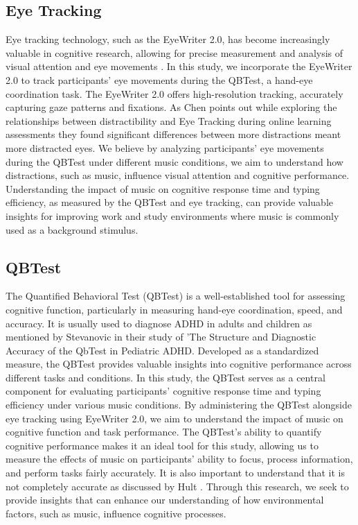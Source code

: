 \documentclass[manuscript, screen, review]{acmart} %
\begin{document}
\subsection{Eye Tracking}
Eye tracking technology, such as the EyeWriter 2.0, has become increasingly valuable in cognitive research, allowing for precise measurement and analysis of visual attention and eye movements \cite{Rana8642988}. 
In this study, we incorporate the EyeWriter 2.0 to track participants' eye movements during the QBTest, a hand-eye coordination task.
The EyeWriter 2.0 offers high-resolution tracking, accurately capturing gaze patterns and fixations.
As Chen \cite{Chen23876} points out while exploring the relationships between distractibility and Eye Tracking during online learning assessments they found significant differences between more distractions meant more distracted eyes. We believe by analyzing participants' eye movements during the QBTest under different music conditions, we aim to understand how distractions, such as music, influence visual attention and cognitive performance.
Understanding the impact of music on cognitive response time and typing efficiency, as measured by the QBTest and eye tracking, can provide valuable insights for improving work and study environments where music is commonly used as a background stimulus.

\subsection{QBTest}
The Quantified Behavioral Test (QBTest) is a well-established tool for assessing cognitive function, particularly in measuring hand-eye coordination, speed, and accuracy. It is usually used to diagnose ADHD in adults and children as mentioned by \cite{Stevanovic} Stevanovic in their study of 'The Structure and Diagnostic Accuracy of the QbTest in Pediatric ADHD.
Developed as a standardized measure, the QBTest provides valuable insights into cognitive performance across different tasks and conditions.
In this study, the QBTest serves as a central component for evaluating participants' cognitive response time and typing efficiency under various music conditions.
By administering the QBTest alongside eye tracking using EyeWriter 2.0, we aim to understand the impact of music on cognitive function and task performance.
The QBTest's ability to quantify cognitive performance makes it an ideal tool for this study, allowing us to measure the effects of music on participants' ability to focus, process information, and perform tasks fairly accurately. It is also important to understand that it is not completely accurate as discussed by Hult \cite{Hult}.
Through this research, we seek to provide insights that can enhance our understanding of how environmental factors, such as music, influence cognitive processes.
\end{document}
